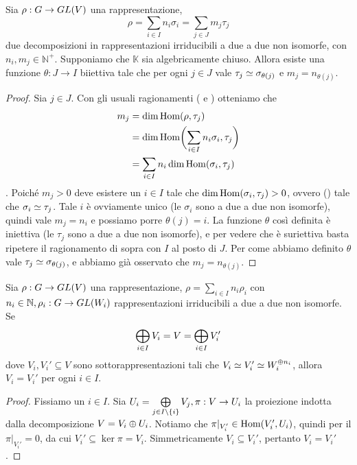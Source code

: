 \begin{proposition}
Sia $\rho:G\to GL(V)$ una rappresentazione,
$$
\rho=\sum_{i\in I}n_i\sigma_i=\sum_{j\in J}m_j\tau_j
$$
due decomposizioni in rappresentazioni irriducibili a due a due non isomorfe, con $n_i\comma m_j\in\mathbb{N}^+$. Supponiamo che $\mathbb{K}$ sia algebricamente chiuso. Allora esiste una funzione $\theta:J\to I$ biiettiva tale che per ogni $j\in J$ vale $\tau_j\simeq\sigma_{\theta(j)}$ e $m_j=n_{\theta(j)}$.
\end{proposition}
\begin{proof}
Sia $j\in J$. Con gli usuali ragionamenti ( e ) otteniamo che
\begin{align*}
m_j&=\dim\operatorname{Hom}(\rho,\tau_j)\\
&=\dim\operatorname{Hom}\biggl(\sum_{i\in I}n_i\sigma_i,\tau_j\biggr)\\
&=\sum_{i\in I}n_i\dim\operatorname{Hom}(\sigma_i,\tau_j)
\end{align*}
. Poiché $m_j>0$ deve esistere un $i\in I$ tale che $\dim\operatorname{Hom}(\sigma_i,\tau_j)>0$, ovvero () tale che $\sigma_i\simeq\tau_j$. Tale $i$ è ovviamente unico (le $\sigma_i$ sono a due a due non isomorfe), quindi vale $m_j=n_i$ e possiamo porre $\theta(j)=i$. La funzione $\theta$ così definita è iniettiva (le $\tau_j$ sono a due a due non isomorfe), e per vedere che è suriettiva basta ripetere il ragionamento di sopra con $I$ al posto di $J$. Per come abbiamo definito $\theta$ vale $\tau_j\simeq\sigma_{\theta(j)}$, e abbiamo già osservato che $m_j=n_{\theta(j)}$.
\end{proof}

\begin{proposition}
Sia $\rho:G\to GL(V)$ una rappresentazione, $\rho=\sum_{i\in I}n_i\rho_i$ con $n_i\in\mathbb{N},\allowbreak\rho_i:G\to GL(W_i)$ rappresentazioni irriducibili a due a due non isomorfe. Se
$$
\bigoplus_{i\in I}V_i=V=\bigoplus_{i\in I}V_i'
$$
dove $V_i\comma V_i'\subseteq V$ sono sottorappresentazioni tali che $V_i\simeq V_i'\simeq W_i^{\oplus n_i}$, allora $V_i=V_i'$ per ogni $i\in I$.
\end{proposition}
\begin{proof}
Fissiamo un $i\in I$. Sia $U_i=\bigoplus\limits_{j\in I\setminus\{i\}}V_j,\allowbreak\pi:V\to U_i$ la proiezione indotta dalla decomposizione $V=V_i\oplus U_i$. Notiamo che $\pi|_{V_i'}\in\operatorname{Hom}(V_i',U_i)$, quindi per il  $\pi|_{V_i'}=0$, da cui $V_i'\subseteq\ker\pi=V_i$. Simmetricamente $V_i\subseteq V_i'$, pertanto $V_i=V_i'$.
\end{proof}

